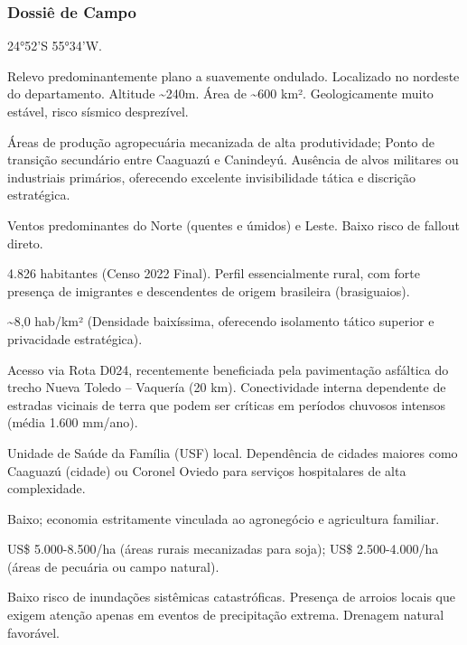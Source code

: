 \subsubsection{Dossiê de Campo}
\begin{description}[style=nextline,leftmargin=0.5cm,font=\bfseries]
\item[Coordenadas]  24°52'S 55°34'W.
\item[Topografia]  Relevo predominantemente plano a suavemente ondulado. Localizado no nordeste do departamento. Altitude \textasciitilde 240m. Área de \textasciitilde 600 km². Geologicamente muito estável, risco sísmico desprezível.
\item[Alvos Estratégicos]  Áreas de produção agropecuária mecanizada de alta produtividade; Ponto de transição secundário entre Caaguazú e Canindeyú. Ausência de alvos militares ou industriais primários, oferecendo excelente invisibilidade tática e discrição estratégica.
\item[Fallout]  Ventos predominantes do Norte (quentes e úmidos) e Leste. Baixo risco de fallout direto.
\item[População]  4.826 habitantes (Censo 2022 Final). Perfil essencialmente rural, com forte presença de imigrantes e descendentes de origem brasileira (brasiguaios).
\item[Densidade]  \textasciitilde 8,0 hab/\allowbreak km² (Densidade baixíssima, oferecendo isolamento tático superior e privacidade estratégica).
\item[Vias de Acesso]  Acesso via Rota D024, recentemente beneficiada pela pavimentação asfáltica do trecho Nueva Toledo -- Vaquería (20 km). Conectividade interna dependente de estradas vicinais de terra que podem ser críticas em períodos chuvosos intensos (média 1.600 mm/\allowbreak ano).
\item[Serviços]  Unidade de Saúde da Família (USF) local. Dependência de cidades maiores como Caaguazú (cidade) ou Coronel Oviedo para serviços hospitalares de alta complexidade.
\item[Custo de Vida]  Baixo; economia estritamente vinculada ao agronegócio e agricultura familiar.
\item[Preço da Terra]  US\$ 5.000-8.500/\allowbreak ha (áreas rurais mecanizadas para soja); US\$ 2.500-4.000/\allowbreak ha (áreas de pecuária ou campo natural).
\item[Hidrologia]  Baixo risco de inundações sistêmicas catastróficas. Presença de arroios locais que exigem atenção apenas em eventos de precipitação extrema. Drenagem natural favorável.

\end{description}

